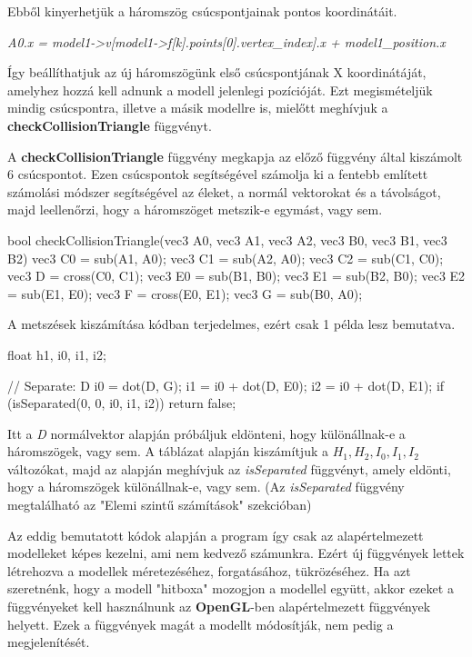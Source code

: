 Ebből kinyerhetjük a háromszög csúcspontjainak pontos koordinátáit.

\textit{A0.x = model1->v[model1->f[k].points[0].vertex\_index].x 
	+ model1\_position.x}

Így beállíthatjuk az új háromszögünk első csúcspontjának X koordinátáját, amelyhez hozzá kell adnunk a modell jelenlegi pozícióját. Ezt megismételjük mindig csúcspontra, illetve a másik modellre is, mielőtt meghívjuk a \textbf{checkCollisionTriangle} függvényt.

\newpage

A \textbf{checkCollisionTriangle} függvény megkapja az előző függvény által kiszámolt 6 csúcspontot. Ezen csúcspontok segítségével számolja ki a fentebb említett számolási módszer segítségével az éleket, a normál vektorokat és a távolságot, majd leellenőrzi, hogy a háromszöget metszik-e egymást, vagy sem.

\begin{cpp}
bool checkCollisionTriangle(vec3 A0, vec3 A1, vec3 A2, vec3 B0,
vec3 B1, vec3 B2)
{
    vec3 C0 = sub(A1, A0);
    vec3 C1 = sub(A2, A0);
    vec3 C2 = sub(C1, C0);
    vec3 D = cross(C0, C1);
    vec3 E0 = sub(B1, B0);
    vec3 E1 = sub(B2, B0);
    vec3 E2 = sub(E1, E0);
    vec3 F = cross(E0, E1);
    vec3 G = sub(B0, A0);
}
\end{cpp}

A metszések kiszámítása kódban terjedelmes, ezért csak 1 példa lesz bemutatva.

\begin{cpp}
float h1, i0, i1, i2;
	
// Separate: D
i0 = dot(D, G);
i1 = i0 + dot(D, E0);
i2 = i0 + dot(D, E1);
if (isSeparated(0, 0, i0, i1, i2))
{
    return false;
}
\end{cpp}

Itt a \textit{D} normálvektor alapján próbáljuk eldönteni, hogy különállnak-e a háromszögek, vagy sem. A táblázat alapján kiszámítjuk a \textit{$H_1, H_2, I_0, I_1, I_2$} változókat, majd az alapján meghívjuk az \textit{isSeparated} függvényt, amely eldönti, hogy a háromszögek különállnak-e, vagy sem. (Az \textit{isSeparated} függvény megtalálható az "Elemi szintű számítások" szekcióban)
\newpage


Az eddig bemutatott kódok alapján a program így csak az alapértelmezett modelleket képes kezelni, ami nem kedvező számunkra. Ezért új függvények lettek létrehozva a modellek méretezéséhez, forgatásához, tükrözéséhez. Ha azt szeretnénk, hogy a modell "hitboxa" mozogjon a modellel együtt, akkor ezeket a függvényeket kell használnunk az \textbf{OpenGL}-ben alapértelmezett függvények helyett. Ezek a függvények magát a modellt módosítják, nem pedig a megjelenítését.

